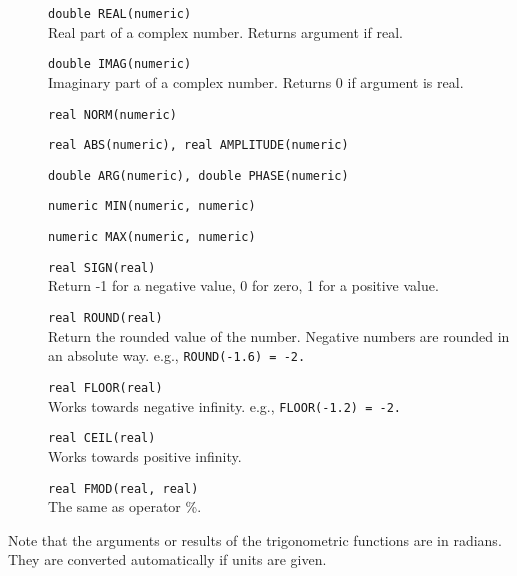 \begin{description}
  \item[] \texttt{double REAL(numeric)}\\
    Real part of a complex number. Returns argument if real.
  \item[] \texttt{double IMAG(numeric)}\\
    Imaginary part of a complex number. Returns 0 if argument is real.
  \item[] \texttt{real NORM(numeric)}
  \item[] \texttt{real ABS(numeric),  real AMPLITUDE(numeric)}
  \item[] \texttt{double ARG(numeric),  double PHASE(numeric)}
  \item[] \texttt{numeric MIN(numeric, numeric)}
  \item[] \texttt{numeric MAX(numeric, numeric)}
  \item[] \texttt{real SIGN(real)}\\
    Return -1 for a negative value, 0 for zero, 1 for a positive value.
  \item[] \texttt{real ROUND(real)}\\
    Return the rounded value of the number. Negative numbers are
    rounded in an absolute way.
    e.g., \texttt{ROUND(-1.6) = -2.}
  \item[] \texttt{real FLOOR(real)}\\
    Works towards negative infinity.
    e.g., \texttt{FLOOR(-1.2) = -2.}
  \item[] \texttt{real CEIL(real)}\\
    Works towards positive infinity.
  \item[] \texttt{real FMOD(real, real)}\\
    The same as operator \%.
\end{description}
Note that the arguments or results of the trigonometric functions are
in radians. They are converted automatically if units are given.

